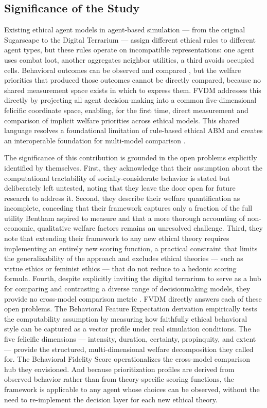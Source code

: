 \documentclass{icsthesis}
\begin{document}
\begin{mainmatter}
			\subsection{Significance of the Study}
Existing ethical agent models in agent-based simulation --- from the original Sugarscape \citep{EpsteinAxtell1996} to the Digital Terrarium \citep{KremerHerman2024b} --- assign different ethical rules to different agent types, but these rules operate on incompatible representations: one agent uses combat loot, another aggregates neighbor utilities, a third avoids occupied cells. Behavioral outcomes can be observed and compared \citep{KremerHerman2024b, LasquetyReyes2018}, but the welfare priorities that produced those outcomes cannot be directly compared, because no shared measurement space exists in which to express them. FVDM addresses this directly by projecting all agent decision-making into a common five-dimensional felicific coordinate space, enabling, for the first time, direct measurement and comparison of implicit welfare priorities across ethical models. This shared language resolves a foundational limitation of rule-based ethical ABM and creates an interoperable foundation for multi-model comparison \citep{Halpern2021, Bontempi2025}.

The significance of this contribution is grounded in the open problems explicitly identified by \citet{KremerHerman2024b} themselves. First, they acknowledge that their assumption about the computational tractability of socially-considerate behavior is stated but deliberately left untested, noting that they leave the door open for future research to address it. Second, they describe their welfare quantification as incomplete, conceding that their framework captures only a fraction of the full utility Bentham aspired to measure and that a more thorough accounting of non-economic, qualitative welfare factors remains an unresolved challenge. Third, they note that extending their framework to any new ethical theory requires implementing an entirely new scoring function, a practical constraint that limits the generalizability of the approach and excludes ethical theories --- such as virtue ethics or feminist ethics --- that do not reduce to a hedonic scoring formula. Fourth, despite explicitly inviting the digital terrarium to serve as a hub for comparing and contrasting a diverse range of decisionmaking models, they provide no cross-model comparison metric \citep{KremerHerman2024b}. FVDM directly answers each of these open problems. The Behavioral Feature Expectation derivation empirically tests the computability assumption by measuring how faithfully ethical behavioral style can be captured as a vector profile under real simulation conditions. The five felicific dimensions --- intensity, duration, certainty, propinquity, and extent --- provide the structured, multi-dimensional welfare decomposition they called for. The Behavioral Fidelity Score operationalizes the cross-model comparison hub they envisioned. And because prioritization profiles are derived from observed behavior rather than from theory-specific scoring functions, the framework is applicable to any agent whose choices can be observed, without the need to re-implement the decision layer for each new ethical theory.


\end{mainmatter}
\end{document}
